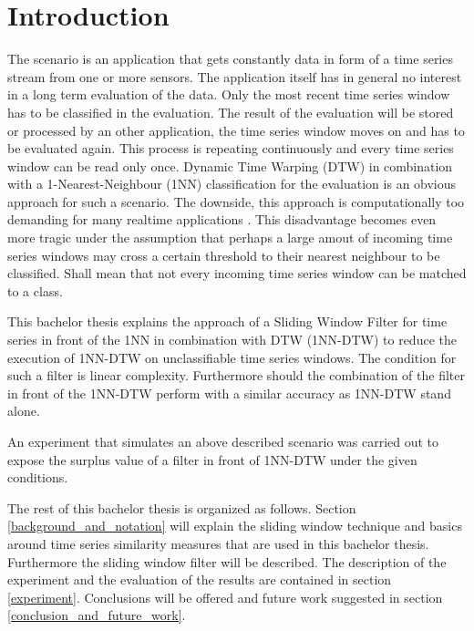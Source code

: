 \section{Introduction} \label{introduction}
The scenario is an application that gets constantly data in form of a time series stream from one or more sensors. The
application itself has in general no interest in a long term evaluation of the data. Only the most recent time series
window has to be classified in the evaluation. The result of the evaluation will be stored or processed by an other
application, the time series window moves on and has to be evaluated again. This process is repeating continuously and
every time series window can be read only once. Dynamic Time Warping (DTW) in combination with a 1-Nearest-Neighbour
(1NN) classification for the evaluation is an obvious approach for such a scenario. The downside, this approach is
computationally too demanding for many realtime applications \cite{xi2006fast}. This disadvantage becomes even more
tragic under the assumption that perhaps a large amout of incoming time series windows may cross a certain threshold to
their nearest neighbour to be classified. Shall mean that not every incoming time series window can be matched to a
class.

This bachelor thesis explains the approach of a Sliding Window Filter for time series in front of the 1NN in combination
with DTW (1NN-DTW) to reduce the execution of 1NN-DTW on unclassifiable time series windows. The condition for such a
filter is linear complexity. Furthermore should the combination of the filter in front of the 1NN-DTW perform with a
similar accuracy as 1NN-DTW stand alone.

An experiment that simulates an above described scenario was carried out to expose the surplus value
of a filter in front of 1NN-DTW under the given conditions.

The rest of this bachelor thesis is organized as follows. Section \ref{background_and_notation} will explain the sliding
window technique and basics around time series similarity measures that are used in this bachelor thesis. Furthermore
the sliding window filter will be described. The description of the experiment and the evaluation of the results are
contained in section \ref{experiment}. Conclusions will be offered and future work suggested in section
\ref{conclusion_and_future_work}.
